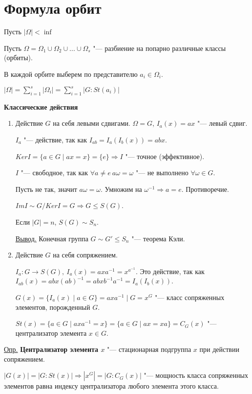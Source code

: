 \documentclass{article}
\begin{document}
\section{Формула орбит}

Пусть $|\Omega| < \inf$

Пусть $\Omega = \Omega_1 \cup \Omega_2 \cup ... \cup \Omega_s$ "--- разбиение на попарно различные классы (орбиты).

В каждой орбите выберем по представителю $a_i \in \Omega_i$.

$|\Omega| = \sum \limits_{i = 1}^{s} |\Omega_i| = \sum \limits_{i = 1}^{s} |G:St(a_i)|$

\textbf{Классические действия}
\begin{enumerate}
	\item Действие $G$ на себя левыми сдвигами. $\Omega = G$, $I_a(x) = ax$ "--- левый сдвиг.
	
	$I_a$ "--- действие, так как $I_{ab} = I_a(I_b(x)) = abx$.
	
	$KerI = \{a \in G \mid ax = x\} = \{e\} \Rightarrow I$ "--- точное (эффективное).
	
	$I$ "--- свободное, так как $\forall a \neq e \   a\omega = \omega$ "--- не выполнено $\forall \omega \in G$.
	
	Пусть не так, значит $a\omega = \omega$. Умножим на $\omega^{-1} \Rightarrow a = e$. Противоречие.
	
	$ImI \sim G/KerI = G \Rightarrow G \leq S(G)$.
	
	Если $|G| = n$, $S(G) \sim S_n$.
	
	\underline{Вывод.} Конечная группа $G \sim G' \leq S_n$ "--- теорема Кэли.
	
	\item Действие $G$ на себя сопряжением.
	
	$I_a: G \rightarrow S(G), \  I_a(x) = axa^{-1} = x^{a^{-1}}$. Это действие, так как $I_{ab}(x) = abx(ab)^{-1} = abxb^{-1}a^{-1} = I_a(I_b(x))$.
	
	$G(x) = \{I_a(x) \mid a \in G\} = {axa^{-1} \mid G} = x^G$ "--- класс сопряженных элементов, порожденный $G$.
	
	$St(x) = \{a \in G \mid axa^{-1} = x\} = \{a \in G\mid ax = xa\} = C_G(x)$ "--- централизатор элемента $x \in G$.
\end{enumerate}

\underline{Опр.} \textbf{Централизатор элемента $x$} "--- стационарная подгруппа $x$ при действии сопряжением.

$|G(x)| = |G:St(x)| \Rightarrow |x^G| = |G:C_G(x)|$ "--- мощность класса сопряженных элементов равна индексу централизатора любого элемента этого класса.
\end{document}
